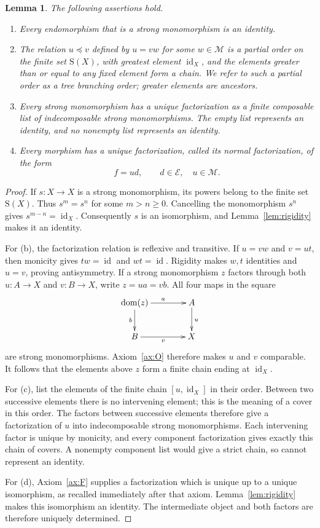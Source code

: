 \documentclass[11pt,a4paper]{article}
\theoremstyle{plain}
\newtheorem{lemma}[theorem]{Lemma}
\theoremstyle{definition}
\theoremstyle{remark}
\newcommand{\Ocat}{\mathcal M}
\newcommand{\Dcat}{\mathcal E}
\newcommand{\id}{\operatorname{id}}
\newcommand{\dom}{\operatorname{dom}}
\newcommand{\Occ}{\mathrm{S}}
\newcommand{\inside}{\mathrel{\preceq}}
\begin{document}
\begin{lemma}\label{prop:paths}
The following assertions hold.
\begin{enumerate}
\item Every endomorphism that is a strong monomorphism is an identity.
\item The relation $u\inside v$ defined by $u=vw$ for some $w\in\Ocat$
is a partial order on the finite set $\Occ(X)$, with greatest
element $\id_X$, and the elements greater than or equal to any fixed
element form a chain. We refer to such a partial order as a
\emph{tree branching order}; greater elements are ancestors.
\item Every strong monomorphism has a unique factorization as a finite composable
list of indecomposable strong monomorphisms. The empty list represents an identity,
and no nonempty list represents an identity.
\item Every morphism has a unique factorization, called its
\emph{normal factorization}, of the form
\begin{equation}\label{eq:normal}
f=ud,\qquad d\in\Dcat,\quad u\in\Ocat.
\end{equation}
\end{enumerate}
\end{lemma}
\begin{proof}
If $s:X\to X$ is a strong monomorphism, its powers belong to the
finite set $\Occ(X)$. Thus $s^m=s^n$ for some $m>n\geq0$.
Cancelling the monomorphism $s^n$ gives $s^{m-n}=\id_X$.
Consequently $s$ is an isomorphism, and Lemma~\ref{lem:rigidity} makes it an identity.

For \textup{(b)}, the factorization relation is reflexive and
transitive. If $u=vw$
and $v=ut$, then monicity gives $tw=\id$ and $wt=\id$.
Rigidity makes $w,t$ identities and $u=v$, proving antisymmetry.
If a strong monomorphism $z$ factors through both $u:A\to X$
and $v:B\to X$, write $z=ua=vb$. All four maps in the square
\[
\xymatrix@C=4em@R=2.5em{
\dom(z)\ar[r]^a\ar[d]_b&A\ar[d]^u\\
B\ar[r]_v&X
}
\]
are strong monomorphisms. Axiom~\ref{ax:O} therefore makes $u$
and $v$ comparable. It follows that the elements above $z$ form
a finite chain ending at $\id_X$.

For \textup{(c)}, list the elements of the finite chain
$[u,\id_X]$ in their order.
Between two successive elements there is no intervening element;
this is the meaning of a cover in this order. The factors between
successive elements therefore give a factorization of $u$ into
indecomposable strong monomorphisms. Each intervening factor is unique
by monicity, and every component factorization gives exactly this
chain of covers. A nonempty component list would give a strict chain,
so cannot represent an identity.

For \textup{(d)}, Axiom~\ref{ax:F} supplies a factorization which
is unique up to a unique isomorphism, as recalled immediately after
that axiom. Lemma~\ref{lem:rigidity} makes this isomorphism an
identity. The intermediate object and both factors are therefore
uniquely determined.
\end{proof}
\end{document}
